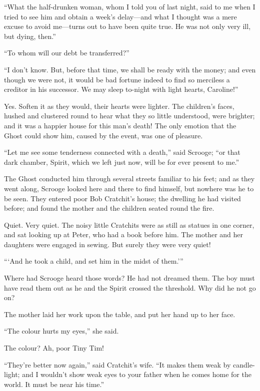 \documentclass[paper=5.5in:8.5in,BCOR=15mm,twoside,DIV=15,headinclude=off,12pt,chapterprefix=off,openany,headings=huge]{scrbook} %
\begin{document}
\enquote{What the half-drunken woman, whom I told you of last night, said to me when I tried to see him and obtain a week's delay—and what I thought was a mere excuse to avoid me—turns out to have been quite true. He was not only very ill, but dying, then.}

\enquote{To whom will our debt be transferred?}

\enquote{I don't know. But, before that time, we shall be ready with the money; and even though we were not, it would be bad fortune indeed to find so merciless a creditor in his successor. We may sleep to-night with light hearts, Caroline!}

Yes. Soften it as they would, their hearts were lighter. The children's faces, hushed and clustered round to hear what they so little understood, were brighter; and it was a happier house for this man's death! The only emotion that the Ghost could show him, caused by the event, was one of pleasure.

\enquote{Let me see some tenderness connected with a death,} said Scrooge; \enquote{or that dark chamber, Spirit, which we left just now, will be for ever present to me.}

The Ghost conducted him through several streets familiar to his feet; and as they went along, Scrooge looked here and there to find himself, but nowhere was he to be seen. They entered poor Bob Cratchit's house; the dwelling he had visited before; and found the mother and the children seated round the fire.

Quiet. Very quiet. The noisy little Cratchits were as still as statues in one corner, and sat looking up at Peter, who had a book before him. The mother and her daughters were engaged in sewing. But surely they were very quiet!

\enquote{\enquote{And he took a child, and set him in the midst of them.}}

Where had Scrooge heard those words? He had not dreamed them. The boy must have read them out as he and the Spirit crossed the threshold. Why did he not go on?

The mother laid her work upon the table, and put her hand up to her face.

\enquote{The colour hurts my eyes,} she said.

The colour? Ah, poor Tiny Tim!

\enquote{They're better now again,} said Cratchit's wife. \enquote{It makes them weak by candle-light; and I wouldn't show weak eyes to your father when he comes home for the world. It must be near his time.}
\end{document}
